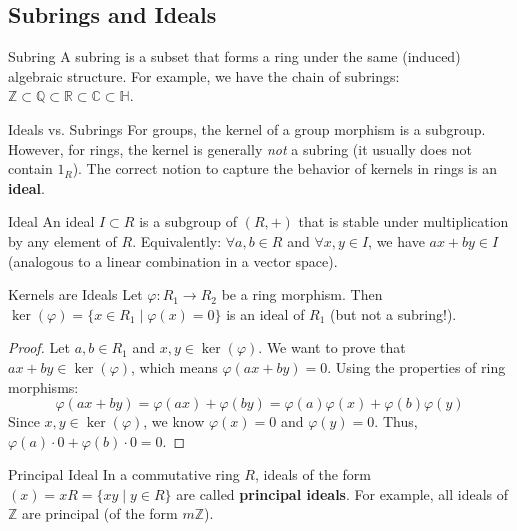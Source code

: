 \documentclass[11pt, a4paper]{article}
\newcommand{\R}{\mathbb{R}}
\newcommand{\Z}{\mathbb{Z}}
\newcommand{\Q}{\mathbb{Q}}
\newcommand{\C}{\mathbb{C}}
\begin{document}
\subsection{Subrings and Ideals}

\begin{definition}{Subring}{}
A subring is a subset that forms a ring under the same (induced) algebraic structure. %
For example, we have the chain of subrings: $\Z \subset \Q \subset \R \subset \C \subset \mathbb{H}$. %
\end{definition}

\begin{remark}{Ideals vs. Subrings}{}
For groups, the kernel of a group morphism is a subgroup. %
However, for rings, the kernel is generally \textit{not} a subring (it usually does not contain $1_R$). %
The correct notion to capture the behavior of kernels in rings is an \textbf{ideal}. %
\end{remark}

\begin{definition}{Ideal}{}
An ideal $I \subset R$ is a subgroup of $(R, +)$ that is stable under multiplication by any element of $R$. %
Equivalently: $\forall a, b \in R$ and $\forall x, y \in I$, we have $ax + by \in I$ (analogous to a linear combination in a vector space). %
\end{definition}

\begin{proposition}{Kernels are Ideals}{}
Let $\varphi : R_1 \to R_2$ be a ring morphism. %
Then $\ker(\varphi) = \{ x \in R_1 \mid \varphi(x) = 0 \}$ is an ideal of $R_1$ (but not a subring!). %
\end{proposition}
\begin{proof}
Let $a, b \in R_1$ and $x, y \in \ker(\varphi)$. %
We want to prove that $ax + by \in \ker(\varphi)$, which means $\varphi(ax + by) = 0$. %
Using the properties of ring morphisms:
$$ \varphi(ax + by) = \varphi(ax) + \varphi(by) = \varphi(a)\varphi(x) + \varphi(b)\varphi(y) $$ %
Since $x, y \in \ker(\varphi)$, we know $\varphi(x) = 0$ and $\varphi(y) = 0$. %
Thus, $\varphi(a)\cdot 0 + \varphi(b)\cdot 0 = 0$. %
\end{proof}

\begin{definition}{Principal Ideal}{}
In a commutative ring $R$, ideals of the form $(x) = xR = \{xy \mid y \in R\}$ are called \textbf{principal ideals}. %
For example, all ideals of $\Z$ are principal (of the form $m\Z$). %
\end{definition}
\end{document}

